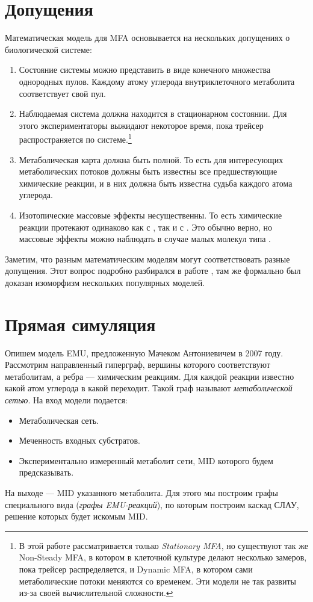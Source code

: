 \documentclass[a4paper, 12pt, left=30mm, right=15mm, top=20mm, bottom=20mm]{report}
\begin{document}
\section{Допущения}
Математическая модель для MFA основывается на нескольких допущениях о биологической системе\cite{Wiechert_1997_1}:
\begin{enumerate}
	\item Состояние системы можно представить в виде конечного множества однородных пулов. Каждому атому углерода внутриклеточного метаболита соответствует свой пул.
	
	\item Наблюдаемая система должна находится в стационарном состоянии. Для этого экспериментаторы выжидают некоторое время, пока трейсер распространяется по системе.\footnote{В этой работе рассматривается только \emph{Stationary MFA}, но существуют так же Non-Steady MFA\cite{NMFA}, в котором в клеточной культуре делают несколько замеров, пока трейсер распределяется, и Dynamic MFA\cite{DMFA}, в котором сами метаболические потоки меняются со временем. Эти модели не так развиты из-за своей вычислительной сложности.}
	
	\item Метаболическая карта должна быть полной. То есть для интересующих метаболических потоков должны быть известны все предшествующие химические реакции, и в них должна быть известна судьба каждого атома углерода.
	
	\item Изотопические массовые эффекты несущественны. То есть химические реакции протекают одинаково как с , так и с . Это обычно верно, но массовые эффекты можно наблюдать в случае малых молекул типа .
\end{enumerate}

Заметим, что разным математическим моделям могут соответствовать разные допущения. Этот вопрос подробно разбирался в работе \cite{formalizm_2017}, там же формально был доказан изоморфизм нескольких популярных моделей.
\clearpage

\section{Прямая симуляция}
Опишем модель EMU, предложенную Мачеком Антониевичем в 2007 году\cite{EMU_2007}. Рассмотрим направленный гиперграф, вершины которого соответствуют метаболитам, а ребра --- химическим реакциям. Для каждой реакции известно какой атом углерода в какой переходит. Такой граф называют \emph{метаболической сетью}. На вход модели подается:
\begin{itemize}
	\item Метаболическая сеть.
	\item Меченность входных субстратов.
	\item Экспериментально измеренный метаболит сети, MID которого будем предсказывать.
\end{itemize}
На выходе --- MID указанного метаболита.
Для этого мы построим графы специального вида (\emph{графы EMU-реакций}), по которым построим каскад СЛАУ, решение которых будет искомым MID.
\end{document}
